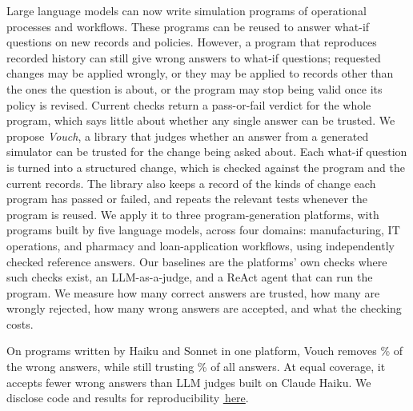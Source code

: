 Large language models can now write simulation programs of operational processes and workflows. These programs can be reused to answer what-if questions on new records and policies. However, a program that reproduces recorded history can still give wrong answers to what-if questions; requested changes may be applied wrongly, or they may be applied to records other than the ones the question is about, or the program may stop being valid once its policy is revised. Current checks return a pass-or-fail verdict for the whole program, which says little about whether any single answer can be trusted. We propose \emph{Vouch}, a library that judges whether an answer from a generated simulator can be trusted for the change being asked about. Each what-if question is turned into a structured change, which is checked against the program and the current records. The library also keeps a record of the kinds of change each program has passed or failed, and repeats the relevant tests whenever the program is reused. We apply it to three program-generation platforms, with programs built by five language models, across four domains: manufacturing, IT operations, and pharmacy and loan-application workflows, using independently checked reference answers. Our baselines are the platforms' own checks where such checks exist, an LLM-as-a-judge, and a ReAct agent that can run the program. We measure how many correct answers are trusted, how many are wrongly rejected, how many wrong answers are accepted, and what the checking costs. 

On programs written by Haiku and Sonnet in one platform, Vouch removes \rWrongRemovedHistClaude\% of the wrong answers, while still trusting \rGateCovClaude\% of all answers. At equal coverage, it accepts fewer wrong answers than LLM judges built on Claude Haiku. We disclose code and results for reproducibility \href{https://anonymous.4open.science/r/vouch_artifact-6893}{\textcolor{ACMDarkBlue}{\faGlobe\,here}}.
